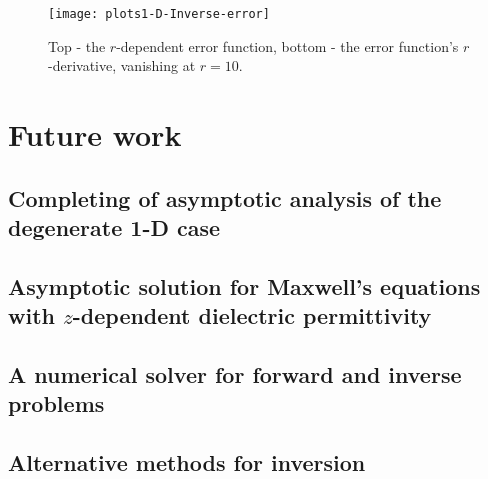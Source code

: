 \documentclass[12pt,twoside]{report}
\begin{document}
\begin{figure}[!htb] 
\begin{center}
\texttt{[image: plots1-D-Inverse-error]}
\end{center}
\caption{Top - the $r$-dependent error function, bottom - the error function's $r$-derivative, vanishing at $r=10$.}


\label{fig:inverseR-1-D-err-and-analytic-dErr}
\end{figure}

\chapter{Future work}
\section{Completing of asymptotic analysis of the degenerate 1-D case}

\section{Asymptotic solution for Maxwell's equations with $z$-dependent dielectric permittivity} 

\section{A numerical solver for forward and inverse problems}

\section{Alternative methods for inversion}
\end{document}
